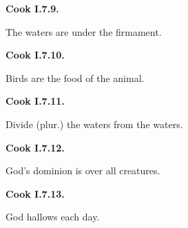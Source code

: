 \par\begin{minipage}{\linewidth}\raggedright
\textbf{Cook I.7.9.}

The waters are under the firmament.

\end{minipage}\par\addvspace{4pt}

\par\begin{minipage}{\linewidth}\raggedright
\textbf{Cook I.7.10.}

Birds are the food of the animal.

\end{minipage}\par\addvspace{4pt}

\par\begin{minipage}{\linewidth}\raggedright
\textbf{Cook I.7.11.}

Divide (plur.) the waters from the waters.

\end{minipage}\par\addvspace{4pt}

\par\begin{minipage}{\linewidth}\raggedright
\textbf{Cook I.7.12.}

God's dominion is over all creatures.

\end{minipage}\par\addvspace{4pt}

\par\begin{minipage}{\linewidth}\raggedright
\textbf{Cook I.7.13.}

God hallows each day.

\end{minipage}\par\addvspace{4pt}

